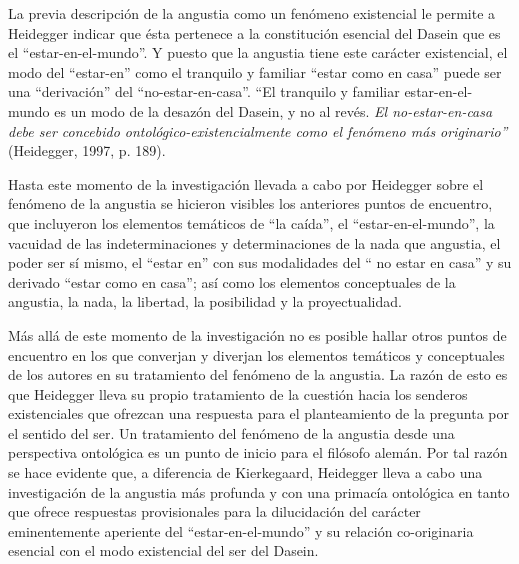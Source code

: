 \begin{refsection}
La previa descripción de la angustia como un fenómeno existencial le permite a Heidegger indicar que ésta pertenece a la constitución esencial del Dasein que es el ``estar-en-el-mundo''. Y puesto que la angustia tiene este carácter existencial, el modo del ``estar-en'' como el tranquilo y familiar ``estar como en casa'' puede ser una ``derivación'' del ``no-estar-en-casa''. ``El tranquilo y familiar estar-en-el-mundo es un modo de la desazón del Dasein, y no al revés. \emph{El no-estar-en-casa debe ser concebido ontológico-existencialmente como el fenómeno más originario''} (Heidegger, 1997, p. 189).

Hasta este momento de la investigación llevada a cabo por Heidegger sobre el fenómeno de la angustia se hicieron visibles los anteriores puntos de encuentro, que incluyeron los elementos temáticos de ``la caída'', el ``estar-en-el-mundo'', la vacuidad de las indeterminaciones y determinaciones de la nada que angustia, el poder ser sí mismo, el ``estar en'' con sus modalidades del `` no estar en casa'' y su derivado ``estar como en casa''; así como los elementos conceptuales de la angustia, la nada, la libertad, la posibilidad y la proyectualidad.

Más allá de este momento de la investigación no es posible hallar otros puntos de encuentro en los que converjan y diverjan los elementos temáticos y conceptuales de los autores en su tratamiento del fenómeno de la angustia. La razón de esto es que Heidegger lleva su propio tratamiento de la cuestión hacia los senderos existenciales que ofrezcan una respuesta para el planteamiento de la pregunta por el sentido del ser. Un tratamiento del fenómeno de la angustia desde una perspectiva ontológica es un punto de inicio para el filósofo alemán. Por tal razón se hace evidente que, a diferencia de Kierkegaard, Heidegger lleva a cabo una investigación de la angustia más profunda y con una primacía ontológica en tanto que ofrece respuestas provisionales para la dilucidación del carácter eminentemente aperiente del ``estar-en-el-mundo'' y su relación co-originaria esencial con el modo existencial del ser del Dasein.


\end{refsection}
